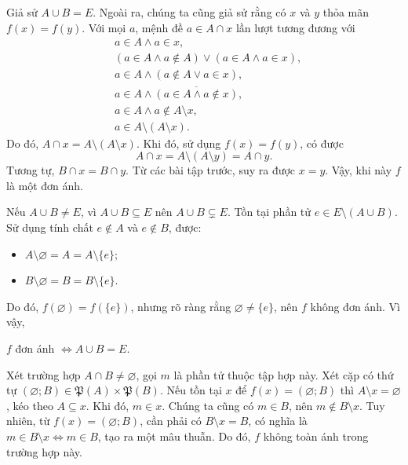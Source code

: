 Giả sử $A \cup B = E$. Ngoài ra, chúng ta cũng giả sử rằng có $x$ và $y$ thỏa mãn $f(x) = f(y)$. Với mọi $a$, mệnh đề $a \in A \cap x$ lần lượt tương đương với \begin{align*}
   &a \in A \land a \in x, \\
   &(a \in A \land a \notin A) \lor (a \in A \land a \in x), \\
   &a \in A \land (a \notin A \lor a \in x), \\
   &a \in A \land \overline{(a \in A \land a \notin x)}, \\
   &a \in A \land a \notin A \setminus x, \\
   &a \in A \setminus (A \setminus x).
\end{align*}
Do đó, $A \cap x = A \setminus (A \setminus x)$. Khi đó, sử dụng $f(x) = f(y)$, có được \begin{equation*}
   A \cap x = A \setminus (A \setminus y) = A \cap y.
\end{equation*}
Tương tự, $B \cap x = B \cap y$. Từ các bài tập trước, suy ra được $x = y$. Vậy, khi này $f$ là một đơn ánh.

Nếu $A \cup B \neq E$, vì $A \cup B \subseteq E$ nên $A \cup B \subsetneq E$. Tồn tại phần tử $e \in E \setminus (A \cup B)$. Sử dụng tính chất $e \notin A$ và $e \notin B$, được:
\begin{itemize}
   \item $A \setminus \varnothing = A = A \setminus \{e\}$;
   \item $B \setminus \varnothing = B = B \setminus \{e\}$.
\end{itemize}
Do đó, $f(\varnothing) = f(\{e\})$, nhưng rõ ràng rằng $\varnothing \neq \{e\}$, nên $f$ không đơn ánh. Vì vậy, 
\begin{center}
   $f$ đơn ánh $\iff A \cup B = E$.
\end{center}

Xét trường hợp $A \cap B \neq \varnothing$, gọi $m$ là phần tử thuộc tập hợp này. Xét cặp có thứ tự $(\varnothing; B) \in \mathfrak{P}(A) \times \mathfrak{P}(B)$. Nếu tồn tại $x$ để $f(x) = (\varnothing; B)$ thì $A \setminus x = \varnothing$, kéo theo $A \subseteq x$. Khi đó, $m \in x$. Chúng ta cũng có $m \in B$, nên $m \notin B \setminus x$. Tuy nhiên, từ $f(x) =  (\varnothing; B)$, cần phải có $B \setminus x = B$, có nghĩa là $m \in B\setminus x \iff m \in B$, tạo ra một mâu thuẫn. Do đó, $f$ không toàn ánh trong trường hợp này.

